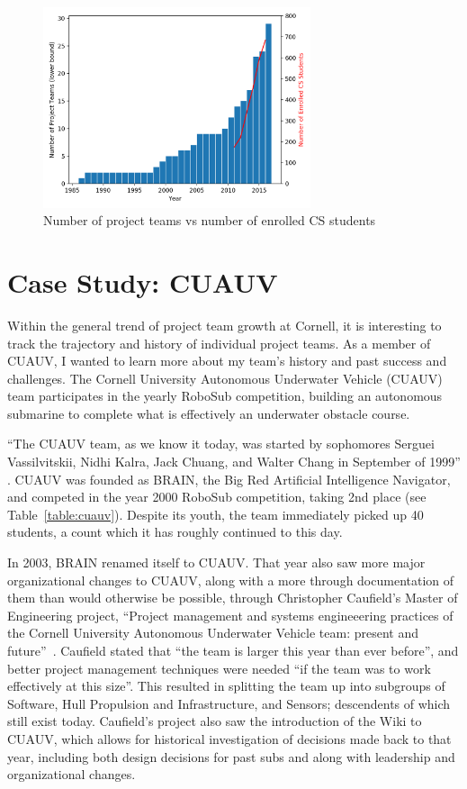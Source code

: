 \documentclass[12pt]{article}
\begin{document}
\begin{figure}
  \center
  \includegraphics[width=0.7\textwidth]{teams-vs-cs}
  \caption{Number of project teams vs number of enrolled CS students~\cite{snabes_computer_2016}}
  \label{fig:teamcount}
\end{figure}


\section{Case Study: CUAUV}
\label{sec:cuauv}

Within the general trend of project team growth at Cornell, it is interesting to track the trajectory and history of individual project teams.
As a member of CUAUV, I wanted to learn more about my team's history and past success and challenges. The Cornell University Autonomous Underwater Vehicle (CUAUV) team participates in the yearly RoboSub competition, building an autonomous submarine to complete what is effectively an underwater obstacle course.


``The CUAUV team, as we know it today, was started by sophomores Serguei Vassilvitskii, Nidhi Kalra, Jack Chuang, and Walter Chang in September of 1999''
\cite{noauthor_cuauv_2003}. CUAUV was founded as BRAIN, the Big Red Artificial Intelligence Navigator, and competed in the year 2000 RoboSub competition, taking 2nd place (see Table~\ref{table:cuauv}).
Despite its youth, the team immediately picked up 40 students, a count which it has roughly continued to this day.

In 2003, BRAIN renamed itself to CUAUV.
That year also saw more major organizational changes to CUAUV, along with a more through documentation of them than would otherwise be possible, through Christopher Caufield's Master of Engineering project, ``Project management and systems engineeering practices of the Cornell University Autonomous Underwater Vehicle team: present and future''~\cite{caufield_project_2004}.
Caufield stated that ``the team is larger this year than ever before'', and better project management techniques were needed ``if the team was to work effectively at this size''.
This resulted in splitting the team up into subgroups of Software, Hull Propulsion and Infrastructure, and Sensors; descendents of which still exist today.
Caufield's project also saw the introduction of the Wiki to CUAUV, which allows for historical investigation of decisions made back to that year, including both design decisions for past subs and along with leadership and organizational changes.
\end{document}

